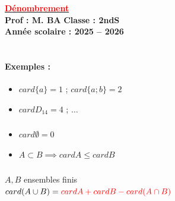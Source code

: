 \documentclass[12pt,a4paper]{article}
\begin{document}
\begin{center}
    \Large\textbf{\underline{\textcolor{red}{Dénombrement}}}\\[-0.1cm]
    \normalsize\textbf{Prof : M. BA} \hfill \textbf{Classe : 2ndS}\\[-0.1cm]
    \textbf{Année scolaire : 2025 -- 2026}
\end{center}

\begin{center}
\end{center}

\section*{\color{red}{I) Cardinal d'un ensemble fini}}

\subsection*{\color{red}{1) Définition}}

\paragraph{Exemples :}
\begin{itemize}
    \item $card \{a\} = 1$ ; $card \{a; b\} = 2$
    \item $card D_{14} = 4$ ; $\dots$
\end{itemize}

\subsubsection*{\color{red}{2) Remarques}}
\begin{itemize}
    \item $card \emptyset = 0$
    \item $A \subset B \implies card A \leqslant card B$
\end{itemize}

\subsubsection*{\color{red}{3) Résultat}}
$A, B$ ensembles finis \\
{\Large $card(A \cup B) = {\color{red} card A + card B - card(A \cap B)}$}
\end{document}
